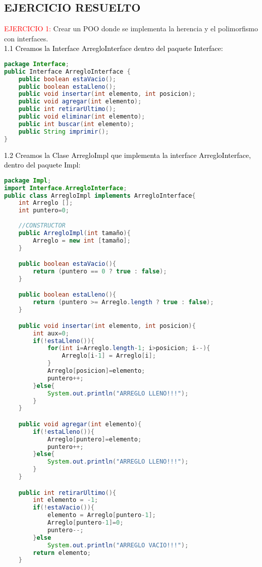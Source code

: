 \documentclass{article}
\begin{document}
\begin{itemize}
    \section{EJERCICIO RESUELTO}
	\begin{itemize}
        \textcolor{red}{EJERCICIO 1:} Crear un POO donde se implementa la herencia y el polimorfismo con interfaces.
        \newline
        \\
        \textcolor{black}{1.1 Creamos la Interface ArregloInterface dentro del paquete Interface:} 
		\begin{lstlisting}[language=java]
package Interface;
public Interface ArregloInterface {
    public boolean estaVacio();
    public boolean estaLleno();
    public void insertar(int elemento, int posicion);
    public void agregar(int elemento);
    public int retirarUltimo();
    public void eliminar(int elemento);
    public int buscar(int elemento);
    public String imprimir();
}
        \end{lstlisting}
        \textcolor{black}{1.2 Creamos la Clase ArregloImpl que implementa la interface ArregloInterface, dentro del paquete Impl:} 
		\begin{lstlisting}[language=java]
package Impl;
import Interface.ArregloInterface;
public class ArregloImpl implements ArregloInterface{
    int Arreglo []; 
    int puntero=0;
    
    //CONSTRUCTOR
    public ArregloImpl(int tamaño){
        Arreglo = new int [tamaño];        
    }

    public boolean estaVacio(){
        return (puntero == 0 ? true : false);
    }

    public boolean estaLleno(){
        return (puntero >= Arreglo.length ? true : false);
    }

    public void insertar(int elemento, int posicion){
        int aux=0;
        if(!estaLleno()){
            for(int i=Arreglo.length-1; i>posicion; i--){
                Arreglo[i-1] = Arreglo[i];
            }
            Arreglo[posicion]=elemento;
            puntero++;
        }else{
            System.out.println("ARREGLO LLENO!!!");
        }
    }

    public void agregar(int elemento){
        if(!estaLleno()){
            Arreglo[puntero]=elemento;
            puntero++;
        }else{
            System.out.println("ARREGLO LLENO!!!");
        }
    }

    public int retirarUltimo(){
        int elemento = -1;
        if(!estaVacio()){
            elemento = Arreglo[puntero-1];
            Arreglo[puntero-1]=0;
            puntero--;
        }else
            System.out.println("ARREGLO VACIO!!!");
        return elemento;
    }


\end{lstlisting}
\end{itemize}
\end{itemize}
\end{document}

